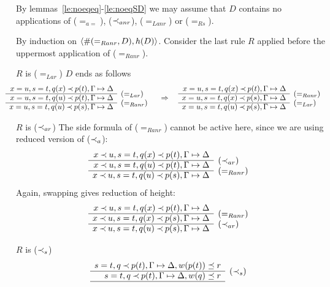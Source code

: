 \begin{PROOF}
By lemmas~\ref{le:noeqeq}-\ref{le:noeqSD} we may assume that $D$ contains no
applications of ($=_{a=}$), ($\mathbin{\prec}_{anr}$), ($=_{Lanr}$) or ($=_{Rs}$).

By induction on $\langle\#(=_{Ranr},D),h(D)\rangle$. Consider the last rule
 $R$ applied before the uppermost application of ($=_{Ranr}$).
\begin{LS}
\item $R$ is ($=_{Lar}$) $D$ ends as follows
\[ \hspace*{-1.5em}  \begin{array}{rl} 
x=u, s=t, q(x)\Incl p(t), \GSD \\ \cline{1-1}
x=u, s=t, q(u)\Incl p(t), \GSD & \rabove{(=_{Lar})} \\ \cline{1-1}
x=u, s=t, q(u)\Incl p(s), \GSD & \rabove{(=_{Ranr})} \end{array} \conv
\begin{array}{rl}
x=u, s=t, q(x)\Incl p(t), \GSD \\ \cline{1-1}
x=u, s=t, q(x)\Incl p(s), \GSD & \rabove{(=_{Ranr})} \\ \cline{1-1}
x=u, s=t, q(u)\Incl p(s), \GSD & \rabove{(=_{Lar})} \end{array} \]
%
\item $R$ is ($\mathbin{\prec}_{ar}$) The side formula of ($=_{Ranr}$) cannot be active
here, since we are using reduced version of ($\mathbin{\prec}_a$):
\[ \begin{array}{rl}
x\Incl u, s=t, q(x)\Incl p(t), \GSD \\ \cline{1-1}
x\Incl u, s=t, q(u)\Incl p(t), \GSD & \rabove{(\Incl_{ar})} \\ \cline{1-1}
x\Incl u, s=t, q(u)\Incl p(s), \GSD & \rabove{(=_{Ranr})} \end{array} \]
Again, swapping gives reduction of height:
\[ \begin{array}{rl}
x\Incl u, s=t, q(x)\Incl p(t), \GSD \\ \cline{1-1}
x\Incl u, s=t, q(x)\Incl p(s), \GSD & \rabove{(=_{Ranr})} \\ \cline{1-1}
x\Incl u, s=t, q(u)\Incl p(s), \GSD & \rabove{(\Incl_{ar})} \end{array} \]
%
\item $R$ is ($\mathbin{\prec}_{s}$)
\[ \begin{array}{rl}
s=t, q\Incl p(t), \GSD, w(p(t))\preceq r \\ \cline{1-1}
s=t, q\Incl p(t), \GSD, w(q)\preceq r & \rabove{(\Incl_s)} \\ \cline{1-1}

\end{array}\]
\end{LS}
\end{PROOF}
